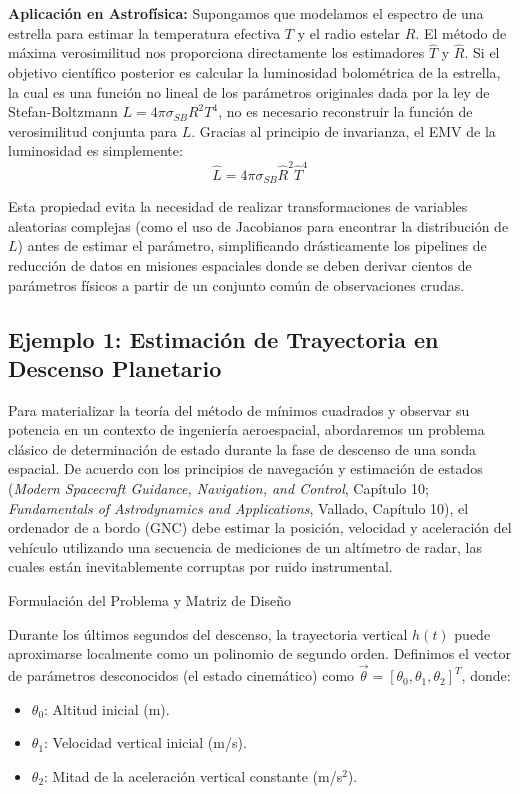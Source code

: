 \textbf{Aplicación en Astrofísica:}
Supongamos que modelamos el espectro de una estrella para estimar la temperatura efectiva $T$ y el radio estelar $R$. El método de máxima verosimilitud nos proporciona directamente los estimadores $\hat{T}$ y $\hat{R}$. Si el objetivo científico posterior es calcular la luminosidad bolométrica de la estrella, la cual es una función no lineal de los parámetros originales dada por la ley de Stefan-Boltzmann $L = 4\pi \sigma_{SB} R^2 T^4$, no es necesario reconstruir la función de verosimilitud conjunta para $L$. Gracias al principio de invarianza, el EMV de la luminosidad es simplemente:
$$ \hat{L} = 4\pi \sigma_{SB} \hat{R}^2 \hat{T}^4 $$

Esta propiedad evita la necesidad de realizar transformaciones de variables aleatorias complejas (como el uso de Jacobianos para encontrar la distribución de $L$) antes de estimar el parámetro, simplificando drásticamente los pipelines de reducción de datos en misiones espaciales donde se deben derivar cientos de parámetros físicos a partir de un conjunto común de observaciones crudas.


\subsection{Ejemplo 1: Estimación de Trayectoria en Descenso Planetario}

Para materializar la teoría del método de mínimos cuadrados y observar su potencia en un contexto de ingeniería aeroespacial, abordaremos un problema clásico de determinación de estado durante la fase de descenso de una sonda espacial. De acuerdo con los principios de navegación y estimación de estados (\textit{Modern Spacecraft Guidance, Navigation, and Control}, Capítulo 10; \textit{Fundamentals of Astrodynamics and Applications}, Vallado, Capítulo 10), el ordenador de a bordo (GNC) debe estimar la posición, velocidad y aceleración del vehículo utilizando una secuencia de mediciones de un altímetro de radar, las cuales están inevitablemente corruptas por ruido instrumental.

Formulación del Problema y Matriz de Diseño

Durante los últimos segundos del descenso, la trayectoria vertical $h(t)$ puede aproximarse localmente como un polinomio de segundo orden. Definimos el vector de parámetros desconocidos (el estado cinemático) como $\vec{\theta} = [\theta_0, \theta_1, \theta_2]^T$, donde:
\begin{itemize}
    \item $\theta_0$: Altitud inicial (m).
    \item $\theta_1$: Velocidad vertical inicial (m/s).
    \item $\theta_2$: Mitad de la aceleración vertical constante (m/s$^2$).
\end{itemize}

